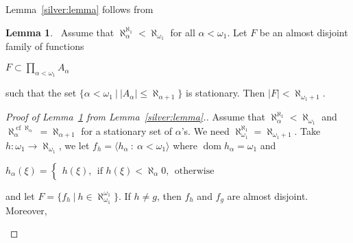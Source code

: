 \documentclass[8pt]{article}
\theoremstyle{definition}
\theoremstyle{definition}
\theoremstyle{definition}
\theoremstyle{definition}
\theoremstyle{definition}
\theoremstyle{definition}
\theoremstyle{definition}
\theoremstyle{definition}
\newtheorem{lemma}{Lemma}[section]
\theoremstyle{definition}
\theoremstyle{definition}
\theoremstyle{definition}
\theoremstyle{definition}
\theoremstyle{definition}
\theoremstyle{definition}
\theoremstyle{question}
\begin{document}
Lemma~\ref{silver:lemma} follows from
\begin{lemma}~\label{silver:lemma:2}
  Assume that $\aleph^{\aleph_1}_{\alpha} < \aleph_{\omega_1}$ for all $\alpha < \omega_1$. Let $F$
  be an almost disjoint family of functions
  \begin{center}
    $F \subset \prod \limits_{\alpha < \omega_1} A_{\alpha}$
  \end{center}
  such that the set $\{ \alpha < \omega_1 \: | \: |A_{\alpha}| \leq \aleph_{\alpha + 1}\}$ is stationary.
  Then $|F| < \aleph_{\omega_1 + 1}$.
\end{lemma}
\begin{proof}[Proof of Lemma~\ref{silver:lemma:2} from Lemma~\ref{silver:lemma}.]

  Assume that $\aleph^{\aleph_1}_{\alpha} < \aleph_{\omega_1}$ and 
  $\aleph^{\operatorname{cf} \aleph_{\alpha}}_{\alpha} = \aleph_{\alpha + 1}$ for a stationary set of $\alpha$'s.
  We need $\aleph^{\aleph_1}_{\omega_1} = \aleph_{\omega_1 + 1}$.
  Take $h : \omega_1 \to \aleph_{\omega_1}$, we let $f_h = \langle h_{\alpha} \: : \: \alpha < \omega_1 \rangle$
  where $\operatorname{dom} h_{\alpha} = \omega_1$ and
  \begin{center}
    $h_{\alpha}(\xi) = \begin{cases}
      h(\xi), \:\: \text{if $h(\xi) < \aleph_{\alpha}$}
      0, \:\: \text{otherwise}
    \end{cases}$
  \end{center}
  and let $F = \{ f_h \: | \: h \in \aleph_{\omega_1}^{\omega_1}\}$. If $h \neq g$, then $f_h$ and $f_g$ are almost disjoint.
  Moreover, 
  \begin{center}
  \end{center}
\end{proof}



\end{document}
